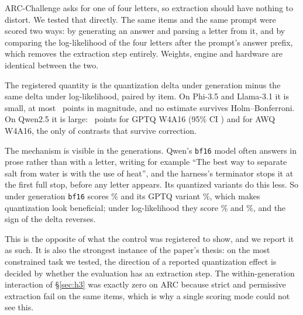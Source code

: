 \documentclass[conference]{IEEEtran}
\begin{document}
ARC-Challenge asks for one of four letters, so extraction should have nothing to distort.
We tested that directly. The same \hSixItems{} items and the same prompt were scored two
ways: by generating an answer and parsing a letter from it, and by comparing the
log-likelihood of the four letters after the prompt's answer prefix, which removes the
extraction step entirely. Weights, engine and hardware are identical between the two.

The registered quantity is the quantization delta under generation minus the same delta
under log-likelihood, paired by item. On Phi-3.5 and Llama-3.1 it is small, at most
\hSixMaxOther{}~points in magnitude, and no estimate survives Holm--Bonferroni.
On Qwen2.5 it is large: \hSixQwenGptq{}~points for GPTQ W4A16 (95\% CI \hSixQwenGptqCI{})
and \hSixQwenAwq{} for AWQ W4A16, the only \hSixRejected{} of \hSixM{} contrasts that
survive correction.

The mechanism is visible in the generations. Qwen's \texttt{bf16} model often answers
in prose rather than with a letter, writing for example ``The best way to separate salt
from water is with the use of heat'', and the harness's terminator stops it at the first
full stop, before any letter appears. Its quantized variants do this less. So under
generation \texttt{bf16} scores \hSixQwenBfGen\% and its GPTQ variant \hSixQwenGptqGen\%,
which makes quantization look beneficial; under log-likelihood they score
\hSixQwenBfLL\% and \hSixQwenGptqLL\%, and the sign of the delta reverses.

This is the opposite of what the control was registered to show, and we report it as
such. It is also the strongest instance of the paper's thesis: on the most constrained
task we tested, the direction of a reported quantization effect is decided by whether
the evaluation has an extraction step. The within-generation interaction of
\S\ref{sec:h3} was exactly zero on ARC because strict and permissive extraction fail on
the same items, which is why a single scoring mode could not see this.
\end{document}
